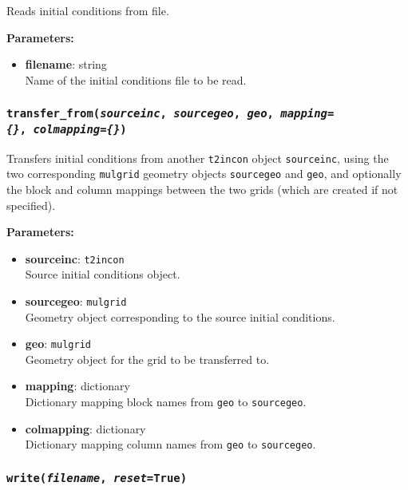 Reads initial conditions from file.

\textbf{Parameters:}
\begin{itemize}
\item \textbf{filename}: string\\
  Name of the initial conditions file to be read.
\end{itemize}

\begin{snugshade}
\subsubsection{\texttt{transfer\_from(\emph{sourceinc}, \emph{sourcegeo}, \emph{geo}, \emph{mapping=\{\}},\
    \emph{colmapping=\{\}})}}
\end{snugshade}
\label{sec:t2incon:transfer_from}

Transfers initial conditions from another \texttt{t2incon} object \texttt{sourceinc}, using the two corresponding \texttt{mulgrid} geometry objects \texttt{sourcegeo} and \texttt{geo}, and optionally the block and column mappings between the two grids (which are created if not specified).

\textbf{Parameters:}
\begin{itemize}
\item \textbf{sourceinc}: \texttt{t2incon}\\
  Source initial conditions object.
\item \textbf{sourcegeo}: \texttt{mulgrid}\\
  Geometry object corresponding to the source initial conditions.
\item \textbf{geo}: \texttt{mulgrid}\\
  Geometry object for the grid to be transferred to.
\item \textbf{mapping}: dictionary\\
  Dictionary mapping block names from \texttt{geo} to \texttt{sourcegeo}.
\item \textbf{colmapping}: dictionary\\
  Dictionary mapping column names from \texttt{geo} to \texttt{sourcegeo}.
\end{itemize}

\begin{snugshade}
\subsubsection{\texttt{write(\emph{filename}, \emph{reset}=True)}}
\end{snugshade}
\label{sec:t2incon:write}

